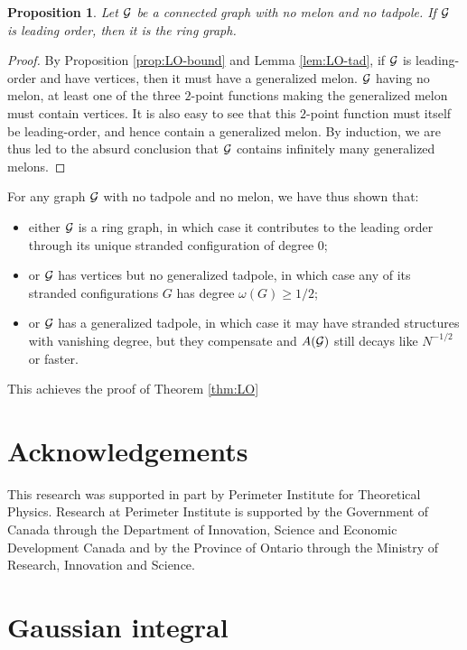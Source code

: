 \documentclass[10pt]{article}
\theoremstyle{plain}
\newtheorem{proposition}{Proposition}
\theoremstyle{definition}
\newcommand{\cG}{{\cal G}}
\begin{document}
\begin{proposition}\label{propo:LO-ring}
Let $\cG$ be a connected graph with no melon and no tadpole. If $\cG$ is leading order, then it is the ring graph. 
\end{proposition}
\begin{proof}
By Proposition \ref{prop:LO-bound} and Lemma \ref{lem:LO-tad}, if $\cG$ is leading-order and have vertices, then it must have a generalized melon. $\cG$ having no melon, at least one of the three $2$-point functions making the generalized melon must contain vertices. It is also easy to see that this $2$-point function must itself be leading-order, and hence contain a generalized melon. By induction, we are thus led to the absurd conclusion that $\cG$ contains infinitely many generalized melons. 
\end{proof}
For any graph $\cG$ with no tadpole and no melon, we have thus shown that:
\begin{itemize}
\item either $\cG$ is a ring graph, in which case it contributes to the leading order through its unique stranded configuration of degree $0$;
\item or $\cG$ has vertices but no generalized tadpole, in which case any of its stranded configurations $G$ has degree $\omega(G) \geq 1/2$;
\item or $\cG$ has a generalized tadpole, in which case it may have stranded structures with vanishing degree, but they compensate and $A(\cG)$ still decays like $N^{-1/2}$ or faster.  
\end{itemize} 

This achieves the proof of Theorem \ref{thm:LO}

\cleardoublepage



\appendix


\section*{Acknowledgements}

\noindent This research was supported in part by Perimeter Institute for Theoretical Physics. Research at Perimeter Institute is supported by the Government of Canada 
through the Department of Innovation, Science and Economic Development Canada and by the Province of Ontario through the Ministry of Research, Innovation and Science.


\section{Gaussian integral}\label{app:gauss}
\end{document}
